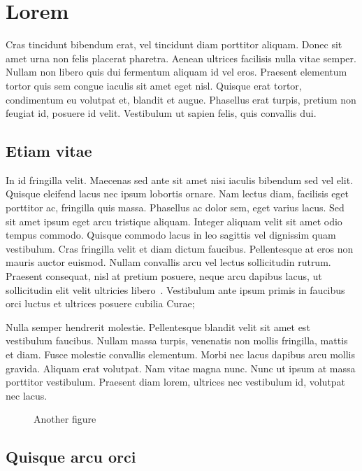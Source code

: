 \chapter{Lorem}
\label{section:lorem}

Cras tincidunt bibendum erat, vel tincidunt diam porttitor aliquam. Donec sit
amet urna non felis placerat pharetra. Aenean ultrices facilisis nulla vitae
semper. Nullam non libero quis dui fermentum aliquam id vel eros. Praesent
elementum tortor quis sem congue iaculis sit amet eget nisl. Quisque erat
tortor, condimentum eu volutpat et, blandit et augue. Phasellus erat turpis,
pretium non feugiat id, posuere id velit. Vestibulum ut sapien felis, quis
convallis dui.

\section{Etiam vitae}
\label{section:lorem:etiam}

In id fringilla velit. Maecenas sed ante sit amet nisi iaculis bibendum sed vel
elit. Quisque eleifend lacus nec ipsum lobortis ornare. Nam lectus diam,
facilisis eget porttitor ac, fringilla quis massa. Phasellus ac dolor sem, eget
varius lacus. Sed sit amet ipsum eget arcu tristique aliquam. Integer aliquam
velit sit amet odio tempus commodo. Quisque commodo lacus in leo sagittis vel
dignissim quam vestibulum. Cras fringilla velit et diam dictum faucibus.
Pellentesque at eros non mauris auctor euismod. Nullam convallis arcu vel lectus
sollicitudin rutrum. Praesent consequat, nisl at pretium posuere, neque arcu
dapibus lacus, ut sollicitudin elit velit ultricies libero~\cite{Author:06}.
Vestibulum ante ipsum primis in faucibus orci luctus et ultrices posuere cubilia
Curae;

Nulla semper hendrerit molestie. Pellentesque blandit velit sit amet est
vestibulum faucibus. Nullam massa turpis, venenatis non mollis fringilla, mattis
et diam. Fusce molestie convallis elementum. Morbi nec lacus dapibus arcu mollis
gravida. Aliquam erat volutpat. Nam vitae magna nunc. Nunc ut ipsum at massa
porttitor vestibulum. Praesent diam lorem, ultrices nec vestibulum id, volutpat
nec lacus.

\begin{figure}[ht]
	\centering
	
	\caption{Another figure}
	\label{figure:another}
\end{figure}

\section{Quisque arcu orci}
\label{section:lorem:quisque}

